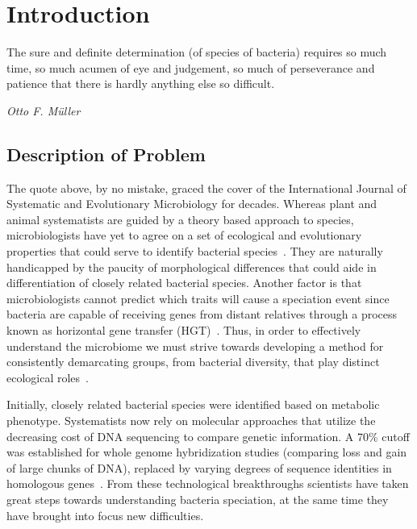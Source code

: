 \chapter{Introduction}
\begin{shadequote}
The sure and definite determination (of species of bacteria) requires so much time, so much acumen of eye and judgement, so much of perseverance and patience that there is hardly anything else so \mbox{difficult}. \par\emph{Otto F. M\"uller}
\end{shadequote}


\section{Description of Problem}
The quote above, by no mistake, graced the cover of the International Journal of Systematic and Evolutionary Microbiology for decades.
Whereas plant and animal systematists are guided by a theory based approach to  species, microbiologists have yet to agree on a set of ecological and evolutionary properties that could serve to identify bacterial species~\cite{cohan2007systematics}.
They are naturally handicapped by the paucity of morphological differences that could aide in differentiation of closely related bacterial species.
Another factor is that microbiologists cannot predict which traits will cause a speciation event since bacteria are capable of receiving genes from distant relatives through a process known as horizontal gene transfer (HGT)~\cite{cohan2007systematics}.
Thus, in order to effectively understand the microbiome we must strive towards developing a method for consistently demarcating groups, from bacterial diversity, that play distinct ecological roles~\cite{koeppel2008identifying}.


Initially, closely related bacterial species were identified based on metabolic phenotype.
Systematists now rely on molecular approaches that utilize the decreasing cost of DNA sequencing to compare genetic information.
A 70\% cutoff was established for whole genome hybridization studies (comparing loss and gain of large chunks of DNA), replaced by varying degrees of sequence identities in homologous genes~\cite{cohan2007systematics,carlo}.
From these technological breakthroughs scientists have taken great steps towards understanding bacteria speciation, at the same time they have brought into focus new difficulties.


